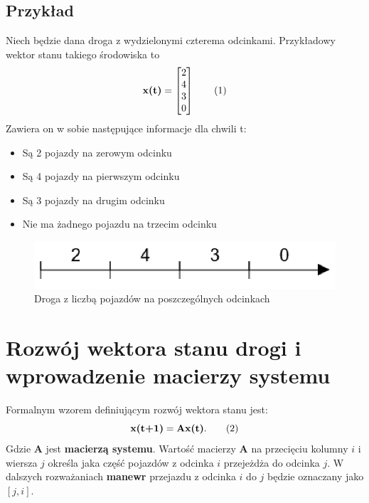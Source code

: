 \documentclass[12pt]{book}
\theoremstyle{plain}
\newcommand\addtag{\refstepcounter{equation}
\renewcommand{\labelenumii}{\theenumii}
\renewcommand{\theenumii}{\theenumi.\arabic{enumii}.}
\tag{\theequation}}
\newcommand{\myref}[1]{(\ref{#1})}
\begin{document}
\subsection*{Przykład} \label{subsec:example-single-road}
Niech będzie dana droga z wydzielonymi czterema odcinkami. Przykładowy wektor stanu takiego środowiska to
\[\textbf{x(t)}=\begin{bmatrix}
2 \\ 4 \\ 3 \\ 0
\end{bmatrix} \addtag \]
Zawiera on w sobie następujące informacje dla chwili t:
\begin{itemize}
	\item Są 2 pojazdy na zerowym odcinku
	\item Są 4 pojazdy na pierwszym odcinku
	\item Są 3 pojazdy na drugim odcinku
	\item Nie ma żadnego pojazdu na trzecim odcinku
\end{itemize}

\begin{figure}[H]
	\centering
	\includegraphics[width=14cm]{images/1_droga_4_odcinki}
	\caption{Droga z liczbą pojazdów na poszczególnych odcinkach}
	\label{fig:single_road}
\end{figure}
\section{Rozwój wektora stanu drogi i wprowadzenie macierzy systemu} \label{sec:macierz_systemu_def}
Formalnym wzorem definiującym rozwój wektora stanu jest:
\[\textbf{x(t+1)}=\textbf{Ax(t)}. \addtag \label{eq:single_road} \]
Gdzie $\textbf{A}$ jest \textbf{macierzą systemu}. Wartość macierzy $\textbf{A}$ na przecięciu kolumny $i$ i wiersza $j$  określa jaka część pojazdów z odcinka $i$ przejeżdża do odcinka $j$. W dalszych rozważaniach \textbf{manewr} przejazdu z odcinka $i$ do $j$ będzie oznaczany jako $[j,i]$.

\end{document}
